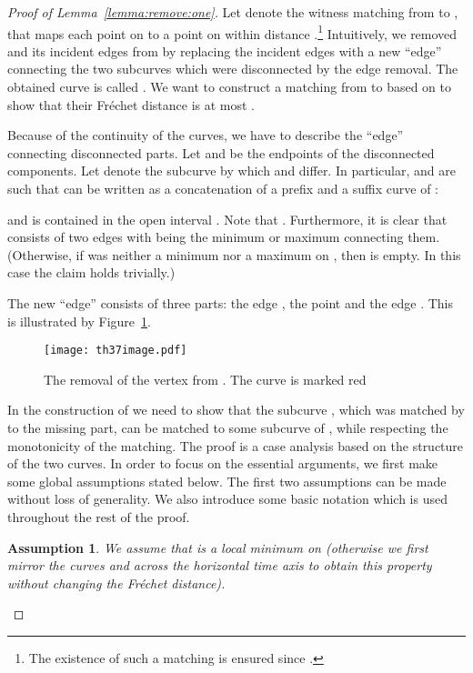 \documentclass[11pt, letter]{article}
\newtheorem{assumption}[]{Assumption}
\newcommand{\lemref}[1]{Lemma~\ref{lemma:#1}}
\newcommand{\figlab}[1]{\label{fig:#1}}
\newcommand{\figref}[1]{Figure~\ref{fig:#1}}
\newcommand{\Frechet}{Fr\'echet\xspace}
\begin{document}
\begin{proof}[Proof of \lemref{remove:one}]
Let  denote the witness matching from  to , that maps each point on  to a point on  within distance .\footnote{The existence of such a matching  is ensured since .} Intuitively, we removed  and its incident edges from  by replacing the incident edges with a new ``edge'' connecting the two subcurves which were disconnected by the edge removal. The obtained curve is called . We want to construct a matching  from  to  based on  to show that their \Frechet distance is at most . 

Because of the continuity of the curves, 
we have to describe the ``edge'' connecting disconnected parts. Let  and  be the endpoints of the disconnected components. Let  denote the subcurve by which  and  differ.  In particular,  and  are such that  can be written as a concatenation of a prefix and a suffix curve of : 
 
and  is contained in the open interval . Note that .  Furthermore, it is clear that  consists of two edges with  being the minimum or maximum connecting them. (Otherwise, if  was neither a minimum nor a maximum on , then  is empty. In this case the claim holds trivially.) 

The new ``edge''  consists of three parts: the edge , the point  and the edge . This is illustrated by \figref{vertexremovalexample}.


\begin{figure}[h]\centering
\texttt{[image: th37image.pdf]}\\
\caption{The removal of the vertex  from . The curve  is marked red}
\figlab{vertexremovalexample}
\end{figure}


In the construction of  we need to show that the subcurve , which was matched by  to the missing part, can be matched to some subcurve of , while respecting the monotonicity of the matching. The proof is a case analysis based on the structure of the two curves.  In order to focus on the essential arguments, we first make some global assumptions stated below.  The first two assumptions can be made without loss of generality. We also introduce some basic notation which is used throughout the rest of the proof.
\begin{assumption}
We assume that  is a local minimum on  (otherwise we 
first mirror the curves  and  across the horizontal time axis to obtain
this property without changing the \Frechet distance).
\end{assumption}


\end{proof}
\end{document}
